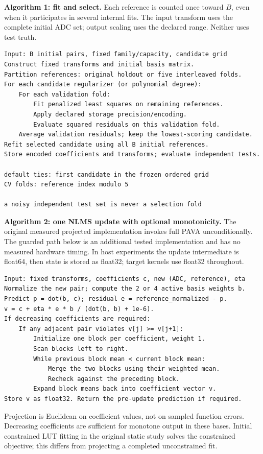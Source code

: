 \documentclass[10pt,letterpaper]{article}
\begin{document}
\textbf{Algorithm 1: fit and select.} Each reference is counted once toward $B$, even when it participates in several internal fits. The input transform uses the complete initial ADC set; output scaling uses the declared range. Neither uses test truth.
\begin{lstlisting}
Input: B initial pairs, fixed family/capacity, candidate grid
Construct fixed transforms and initial basis matrix.
Partition references: original holdout or five interleaved folds.
For each candidate regularizer (or polynomial degree):
    For each validation fold:
        Fit penalized least squares on remaining references.
        Apply declared storage precision/encoding.
        Evaluate squared residuals on this validation fold.
    Average validation residuals; keep the lowest-scoring candidate.
Refit selected candidate using all B initial references.
Store encoded coefficients and transforms; evaluate independent tests.

default ties: first candidate in the frozen ordered grid
CV folds: reference index modulo 5

a noisy independent test set is never a selection fold
\end{lstlisting}

\textbf{Algorithm 2: one NLMS update with optional monotonicity.} The original measured projected implementation invokes full PAVA unconditionally. The guarded path below is an additional tested implementation and has no measured hardware timing. In host experiments the update intermediate is float64, then state is stored as float32; target kernels use float32 throughout.
\begin{lstlisting}
Input: fixed transforms, coefficients c, new (ADC, reference), eta
Normalize the new pair; compute the 2 or 4 active basis weights b.
Predict p = dot(b, c); residual e = reference_normalized - p.
v = c + eta * e * b / (dot(b, b) + 1e-6).
If decreasing coefficients are required:
    If any adjacent pair violates v[j] >= v[j+1]:
        Initialize one block per coefficient, weight 1.
        Scan blocks left to right.
        While previous block mean < current block mean:
            Merge the two blocks using their weighted mean.
            Recheck against the preceding block.
        Expand block means back into coefficient vector v.
Store v as float32. Return the pre-update prediction if required.
\end{lstlisting}
Projection is Euclidean on coefficient values, not on sampled function errors. Decreasing coefficients are sufficient for monotone output in these bases. Initial constrained LUT fitting in the original static study solves the constrained objective; this differs from projecting a completed unconstrained fit.
\end{document}
